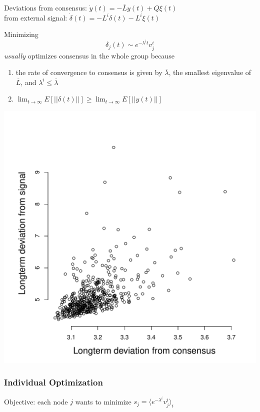 \documentclass{beamer}
\begin{document}
\begin{frame}
\begin{block}{{\small Deviations}}{
{\small from consensus: $\dot{y}(t)=-\overline{L}y(t)+Q\xi(t) $}
\\{\small from external signal: $\dot{\delta}(t)=-L^i\delta(t)-L^i\xi(t)$}
}\end{block}
Minimizing 
$$\delta_j(t)\sim e^{-\lambda^it}v_j^i$$
\textcolor{lightMyColor}{\emph{usually}} optimizes consensus in the whole group because 
\begin{enumerate}
\item the rate of convergence to consensus is given by $\overline{\lambda}$, the smallest eigenvalue of $\overline{L}$, and $\lambda^i\leq\overline{\lambda}$
\item $\lim_{t\to\infty}E[||\delta(t)||]\geq \lim_{t\to\infty}E[||y(t)||]$
\end{enumerate}
\end{frame}

\begin{frame}
\begin{center}
\includegraphics[width=.8\textwidth]{deviations.pdf}
\end{center}
\end{frame}

\begin{frame}
\frametitle{Individual Optimization}
Objective: each node $j$ wants to minimize $s_j=\langle e^{-\lambda^i}v_j^i \rangle _i$
\end{frame}
\end{document}
